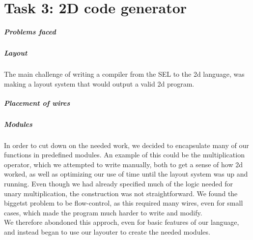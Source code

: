 \chapter*{Task 3: 2D code generator}
\label{compiler}

\paragraph{Problems faced}
\label{compiler:problems}

\paragraph{Layout}
\label{compiler:layout}
The main challenge of writing a compiler from the SEL to the 2d
language, was making a layout system that would output a valid 2d program. 

\paragraph{Placement of wires}
\label{compiler:placement}

\paragraph{Modules}
\label{compiler:modules}
In order to cut down on the needed work, we decided to encapsulate
many of our functions in predefined modules. An example of this could
be the multiplication operator, which we attempted to write manually,
both to get a sense of how 2d worked, as well as optimizing our use of
time until the layout system was up and running. Even though we had
already specified much of the logic needed for unary multiplication,
the construction was not straightforward. We found the biggetst
problem to be flow-control, as this required many wires, even for
small cases, which made the program much harder to write and modify.\\

We therefore abondoned this approch, even for basic features of our language, and instead began to use our layouter to create the needed modules.\\
